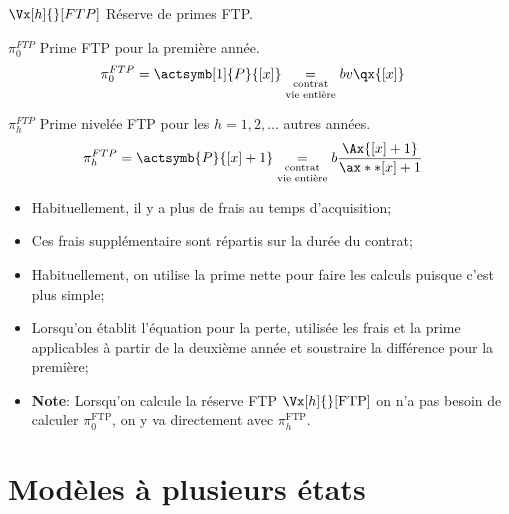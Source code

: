 \documentclass[10pt, french]{article}
\begin{document}
\begin{multicols*}{2}
 
\begin{description}
	\item	$\Vx[h]{}[FTP]$	Réserve de primes FTP.
	\item	$\pi_{0}^{FTP}$	Prime FTP pour la première année.
		\begin{align*}
		\pi_{0}^{FTP}
		&=	\actsymb[1]{P}{[x]}	
		\underset{\scriptsize{\shortstack{contrat\\ vie entière}}}{=}	bv\qx{[x]}
		\end{align*}
	\item	$\pi_{h}^{FTP}$	Prime nivelée FTP pour les $h = 1, 2, \dots$ autres années.
		\begin{align*}
		\pi_{h}^{FTP}
		&=	\actsymb{P}{[x] + 1}	
		\underset{\scriptsize{\shortstack{contrat\\ vie entière}}}{=}	b \frac{\Ax{[x] + 1}}{\ax**{[x] + 1}}
		\end{align*}
\end{description}
\begin{itemize}[leftmargin = *]
	\item	Habituellement, il y a plus de frais au temps d'acquisition;
	\item	Ces frais supplémentaire sont répartis sur la durée du contrat;
	\item	Habituellement, on utilise la prime nette pour faire les calculs puisque c'est plus simple;
	\item	Lorsqu'on établit l'équation pour la perte, utilisée les frais et la prime applicables à partir de la deuxième année et soustraire la différence pour la première;
	\item	\textbf{Note}:	Lorsqu'on calcule la réserve FTP $\Vx[h]{}[\text{FTP}]$ on n'a pas besoin de calculer $\pi_{0}^{\text{FTP}}$, on y va directement avec $\pi_{h}^{\text{FTP}}$.
\end{itemize}

\newpage

\section{Modèles à plusieurs états}



\end{multicols*}
\end{document}
